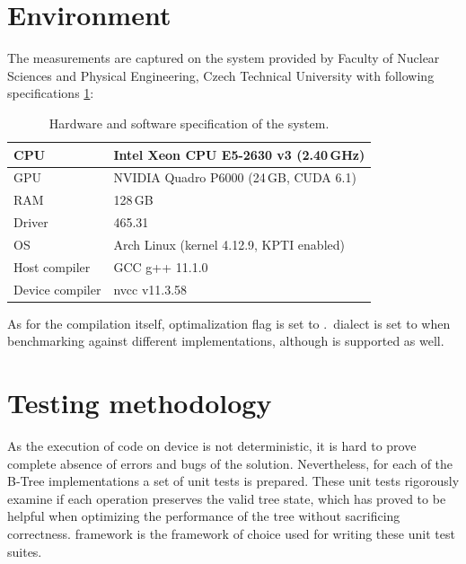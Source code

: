 \section{Environment}

The measurements are captured on the  system provided by Faculty of Nuclear Sciences and Physical Engineering, Czech Technical University with following specifications \ref{table:env-gp1}:

\begin{table}[H]
  \centering
  \begin{tabular}{ | l | l | }
    \hline
    CPU             & Intel Xeon CPU E5-2630 v3 (2.40\,GHz)    \\
    \hline
    GPU             & NVIDIA Quadro P6000 (24\,GB, CUDA 6.1)   \\
    \hline
    RAM             & 128\,GB                                  \\
    \hline
    Driver          & 465.31                                   \\
    \hline
    OS              & Arch Linux (kernel 4.12.9, KPTI enabled) \\
    \hline
    Host compiler   & GCC g++ 11.1.0                           \\
    \hline
    Device compiler & nvcc v11.3.58                            \\
    \hline
  \end{tabular}
  \caption{Hardware and software specification of the  system.}
  \label{table:env-gp1}
\end{table}

As for the compilation itself, optimalization flag is set to .  \CC\,dialect is set to  when benchmarking against different implementations, although  is supported as well.

\section{Testing methodology}

As the execution of code on device is not deterministic, it is hard to prove complete absence of errors and bugs of the solution. Nevertheless, for each of the B-Tree implementations a set of unit tests is prepared. These unit tests rigorously examine if each operation preserves the valid tree state, which has proved to be helpful when optimizing the performance of the tree without sacrificing correctness.  framework \cite{gtest} is the framework of choice used for writing these unit test suites.

